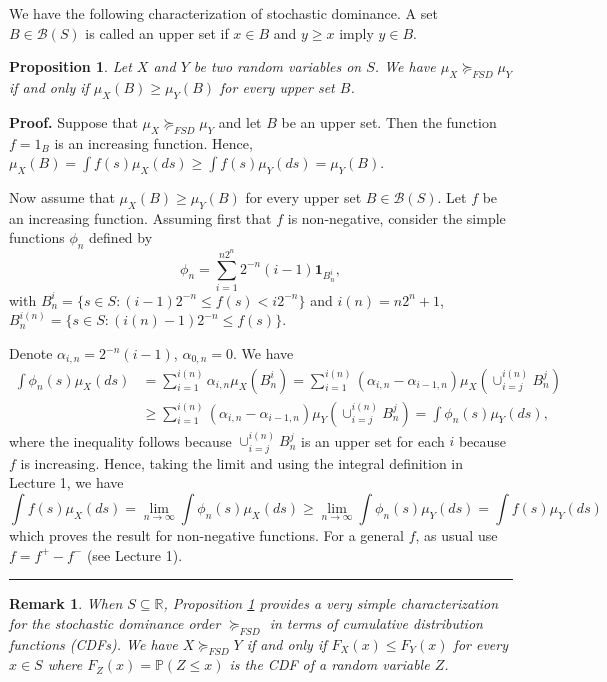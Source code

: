 \documentclass[letter,11pt]{article}
\newtheorem{proposition}{Proposition}[section]
\newtheorem{remark}{Remark}[section]
\newenvironment {proof}[1][Proof]{\noindent \textbf {#1.} }{\ \rule {0.5em}{0.5em}}
\begin{document}
We have the following characterization of stochastic dominance. A set $B \in \mathcal{B}(S)$ is called an upper set if $x \in B$ and $y \geq x$ imply $y \in B$. 

\begin{proposition} \label{prop:FSD}
   Let $X$ and $Y$ be two random variables on $S$. We have $\mu_{X} \succeq_{FSD} \mu_{Y} $ if and only if  $\mu_{X} (B) \geq \mu_{Y} (B) $ for every upper set $B $. 
\end{proposition}

\begin{proof}
    Suppose that $\mu_{X} \succeq_{FSD} \mu_{Y}$ and let $B$ be an upper set. Then the function $f = 1_{B}$ is an increasing function. Hence, $\mu_{X} (B) =  \int f(s) \mu_{X} (ds) \geq \int f(s)  \mu_{Y} (ds) = \mu_{Y} (B)$. 

    Now assume that $\mu_{X} (B) \geq \mu_{Y} (B) $ for every upper set $B \in \mathcal{B}(S)$. Let $f$ be an increasing function. Assuming first that $f$ is non-negative, consider the simple functions $\phi_n$ defined by 
\[
\phi_n = \sum_{i=1}^{n 2^n} 2^{-n}(i-1) \mathbf{1}_{B_n^i},
\]
with $B_n^i = \{s \in S : (i-1)2^{-n} \leq f(s) < i2^{-n}\}$ and $i(n) = n2^{n} + 1$, $B_{n}^{i(n)} = \{s \in S : (i(n)-1)2^{-n} \leq f(s) \}$.

Denote $\alpha_{i,n} = 2^{-n}(i-1)$, $\alpha_{0,n}=0$. We have
\begin{align*}
    \int \phi_{n} (s) \mu_{X} (ds) & = \sum _{i=1}^{i(n)} \alpha_{i,n} \mu_{X}  (B_{n}^{i}) =   \sum _{i=1}^{i(n)} (\alpha_{i,n} -\alpha_{i-1,n} ) \mu_{X}  \left (\cup _{i=j}^{i(n)} B_{n}^{j} \right) \\
   & \geq \sum _{i=1}^{i(n)} (\alpha_{i,n} -\alpha_{i-1,n} ) \mu_{Y}  \left (\cup _{i=j}^{i(n)} B_{n}^{j} \right) =  \int \phi_{n} (s) \mu_{Y} (ds),
\end{align*}
where the inequality follows because $\cup _{i=j}^{i(n)} B_{n}^{j}$ is an upper set for each $i$ because $f$ is increasing. Hence, taking the limit and using the integral definition in Lecture 1, we have 
\[
\int f(s) \mu_{X} (ds) =  \lim _{n \rightarrow \infty} \int \phi_{n} (s) \mu_{X} (ds) \geq    \lim _{n \rightarrow \infty} \int \phi_{n} (s) \mu_{Y} (ds) = \int f(s) \mu_{Y} (ds)
\]
which proves the result for non-negative functions. For a general $f$, as usual use $f = f^{+} - f^{-} $ (see Lecture 1). 
\end{proof}

\begin{remark}
    When $S \subseteq \mathbb{R}$,  Proposition \ref{prop:FSD} provides a very simple characterization for the stochastic dominance order $\succeq_{FSD}$ in terms of cumulative distribution functions (CDFs). We have $X \succeq _{FSD} Y$ if and only if $F_{X} (x) \leq F_{Y}(x) $ for every $x \in S$ where $F_{Z} (x) = \mathbb{P}(Z \leq x)$ is the CDF of a random variable $Z$. 
\end{remark}
\end{document}
